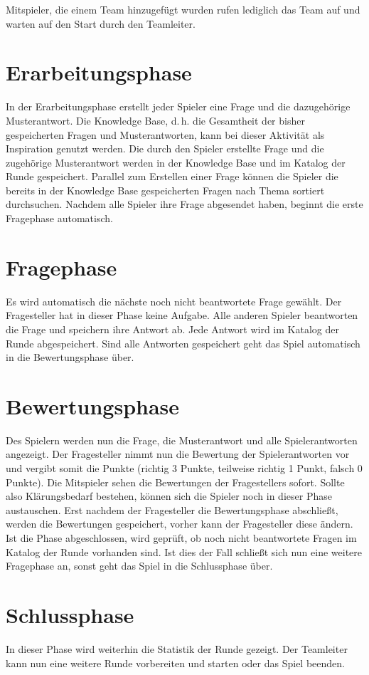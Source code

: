 \documentclass[a4paper,11pt,listof=numbered,glossary=totoc,parskip=half,toc=bib]{scrreprt}
\begin{document}
	Mitspieler, die einem Team hinzugefügt wurden rufen lediglich das Team auf und warten auf den Start durch den Teamleiter.
	
	\section{Erarbeitungsphase}
	In der Erarbeitungsphase erstellt jeder Spieler eine Frage und die dazugehörige Musterantwort. Die
Knowledge Base, d.\,h. die Gesamtheit der bisher gespeicherten Fragen und Musterantworten, kann
bei dieser Aktivität als Inspiration genutzt werden. Die durch den Spieler erstellte Frage und die zugehörige Musterantwort
werden in der Knowledge Base und im Katalog der Runde gespeichert. 
Parallel zum Erstellen einer Frage können die Spieler die bereits in der Knowledge Base gespeicherten Fragen nach Thema sortiert durchsuchen.
Nachdem alle Spieler ihre Frage abgesendet haben, beginnt die erste Fragephase automatisch.

	\section{Fragephase}
	Es wird automatisch die nächste noch nicht beantwortete Frage gewählt. Der Fragesteller hat in dieser Phase keine Aufgabe. Alle anderen Spieler beantworten die Frage und speichern ihre Antwort ab. Jede Antwort wird im Katalog der Runde abgespeichert. Sind alle Antworten gespeichert geht das Spiel automatisch in die Bewertungsphase über.
	
	\section{Bewertungsphase}
	Des Spielern werden nun die Frage, die Musterantwort und alle Spielerantworten angezeigt. Der Fragesteller nimmt nun die Bewertung der Spielerantworten vor und vergibt somit die Punkte (richtig 3 Punkte, teilweise richtig 1 Punkt, falsch 0 Punkte). Die Mitspieler sehen die Bewertungen der Fragestellers sofort. Sollte also Klärungsbedarf bestehen, können sich die Spieler noch in dieser Phase austauschen. Erst nachdem der Fragesteller die Bewertungsphase abschließt, werden die Bewertungen gespeichert, vorher kann der Fragesteller diese ändern. Ist die Phase abgeschlossen, wird geprüft, ob noch nicht beantwortete Fragen im Katalog der Runde vorhanden sind. Ist dies der Fall schließt sich nun eine weitere Fragephase an, sonst geht das Spiel in die Schlussphase über.
	
	\section{Schlussphase}
	In dieser Phase wird weiterhin die Statistik der Runde gezeigt. Der Teamleiter kann nun eine weitere Runde vorbereiten und starten oder das Spiel beenden.
	
\end{document}
